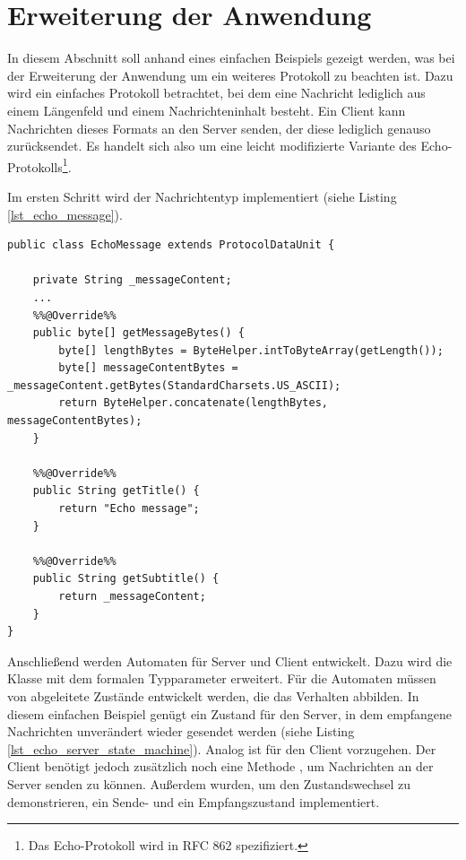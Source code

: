 \section{Erweiterung der Anwendung}

In diesem Abschnitt soll anhand eines einfachen Beispiels gezeigt werden, was bei der Erweiterung der Anwendung um ein weiteres Protokoll zu beachten ist. Dazu wird ein einfaches Protokoll betrachtet, bei dem eine Nachricht lediglich aus einem Längenfeld und einem Nachrichteninhalt besteht. Ein Client kann Nachrichten dieses Formats an den Server senden, der diese lediglich genauso zurücksendet. Es handelt sich also um eine leicht modifizierte Variante des Echo-Protokolls\footnote{Das Echo-Protokoll wird in RFC 862 spezifiziert.}.

Im ersten Schritt wird der Nachrichtentyp implementiert (siehe Listing \ref{lst_echo_message}).

\begin{lstlisting}
public class EchoMessage extends ProtocolDataUnit {
	
	private String _messageContent;
	...
	%%@Override%%
	public byte[] getMessageBytes() {
		byte[] lengthBytes = ByteHelper.intToByteArray(getLength());
		byte[] messageContentBytes = _messageContent.getBytes(StandardCharsets.US_ASCII);
		return ByteHelper.concatenate(lengthBytes, messageContentBytes);
	}

	%%@Override%%
	public String getTitle() {
		return "Echo message";
	}

	%%@Override%%
	public String getSubtitle() {
		return _messageContent;
	}
}
\end{lstlisting}

Anschließend werden Automaten für Server und Client entwickelt. Dazu wird die Klasse  mit dem formalen Typparameter  erweitert. Für die Automaten müssen von  abgeleitete Zustände entwickelt werden, die das Verhalten abbilden. In diesem einfachen Beispiel genügt ein Zustand für den Server, in dem empfangene Nachrichten unverändert wieder gesendet werden (siehe Listing \ref{lst_echo_server_state_machine}). Analog ist für den Client vorzugehen. Der Client benötigt jedoch zusätzlich noch eine Methode , um Nachrichten an der Server senden zu können. Außerdem wurden, um den Zustandswechsel zu demonstrieren, ein Sende- und ein Empfangszustand implementiert. 

